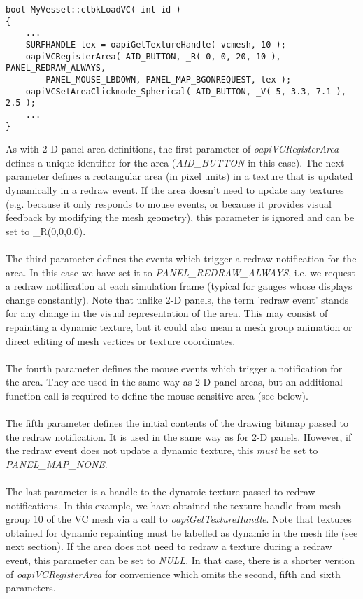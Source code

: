 \documentclass[Orbiter Developer Manual.tex]{subfiles}
\begin{document}
\begin{lstlisting}
bool MyVessel::clbkLoadVC( int id )
{
	...
	SURFHANDLE tex = oapiGetTextureHandle( vcmesh, 10 );
	oapiVCRegisterArea( AID_BUTTON, _R( 0, 0, 20, 10 ), PANEL_REDRAW_ALWAYS,
		PANEL_MOUSE_LBDOWN, PANEL_MAP_BGONREQUEST, tex );
	oapiVCSetAreaClickmode_Spherical( AID_BUTTON, _V( 5, 3.3, 7.1 ), 2.5 );
	...
}
\end{lstlisting}

\noindent
As with 2-D panel area definitions, the first parameter of \textit{oapiVCRegisterArea} defines a unique identifier for the area (\textit{AID\_BUTTON} in this case). The next parameter defines a rectangular area (in pixel units) in a texture that is updated dynamically in a redraw event. If the area doesn't need to update any textures (e.g. because it only responds to mouse events, or because it provides visual feedback by modifying the mesh geometry), this parameter is ignored and can be set to \_R(0,0,0,0).\\
\\
The third parameter defines the events which trigger a redraw notification for the area. In this case we have set it to \textit{PANEL\_REDRAW\_ALWAYS}, i.e. we request a redraw notification at each simulation frame (typical for gauges whose displays change constantly). Note that unlike 2-D panels, the term 'redraw event' stands for any change in the visual representation of the area. This may consist of repainting a dynamic texture, but it could also mean a mesh group animation or direct editing of mesh vertices or texture coordinates.\\
\\
The fourth parameter defines the mouse events which trigger a notification for the area. They are used in the same way as 2-D panel areas, but an additional function call is required to define the mouse-sensitive area (see below).\\
\\
The fifth parameter defines the initial contents of the drawing bitmap passed to the redraw notification. It is used in the same way as for 2-D panels. However, if the redraw event does not update a dynamic texture, this \textit{must} be set to \textit{PANEL\_MAP\_NONE}.\\
\\
The last parameter is a handle to the dynamic texture passed to redraw notifications. In this example, we have obtained the texture handle from mesh group 10 of the VC mesh via a call to \textit{oapiGetTextureHandle}. Note that textures obtained for dynamic repainting must be labelled as dynamic in the mesh file (see next section). If the area does not need to redraw a texture during a redraw event, this parameter can be set to \textit{NULL}. In that case, there is a shorter version of \textit{oapiVCRegisterArea} for convenience which omits the second, fifth and sixth parameters.\\
\end{document}
